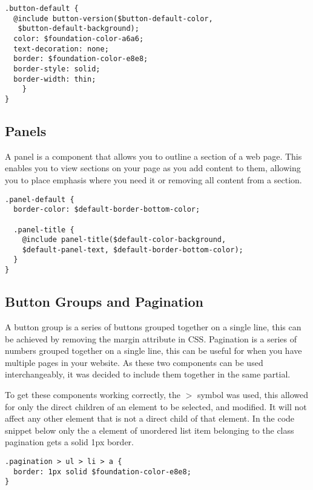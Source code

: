 \begin{lstlisting}[language=CSS3]
.button-default {
  @include button-version($button-default-color,
   $button-default-background);
  color: $foundation-color-a6a6;
  text-decoration: none;
  border: $foundation-color-e8e8;
  border-style: solid;
  border-width: thin;
	}
}
\end{lstlisting}

\subsection*{Panels}
A panel is a component that allows you to outline a section of a web page. This enables you to view sections on your page as you add content to them, allowing you to place emphasis where you need it or removing all content from a section. 

\begin{lstlisting}[language=CSS3]
.panel-default {
  border-color: $default-border-bottom-color;

  .panel-title {
    @include panel-title($default-color-background, 
    $default-panel-text, $default-border-bottom-color);
  }
}
\end{lstlisting}

\newpage
\subsection*{Button Groups and Pagination}
A button group is a series of buttons grouped together on a single line, this can be achieved by removing the margin attribute in \gls{CSS}. Pagination is a series of numbers grouped together on a single line, this can be useful for when you have multiple pages in your website. As these two components can be used interchangeably, it was decided to include them together in the same partial.

To get these components working correctly, the $>$ symbol was used, this allowed for only the direct children of an element to be selected, and modified. It will not affect any other element that is not a direct child of that element. In the code snippet below only the a element of unordered list item belonging to the class pagination gets a solid 1px border.   

\begin{lstlisting}[language=CSS3]
.pagination > ul > li > a {
  border: 1px solid $foundation-color-e8e8;
}
\end{lstlisting}

